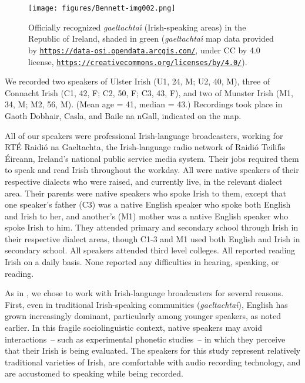 \documentclass[output=paper,colorlinks,citecolor=brown]{langscibook}
\begin{document}
\begin{figure}
    \texttt{[image: figures/Bennett-img002.png]}
    \caption{Officially recognized \emph{gaeltachta\'{\i}} (Irish-speaking areas) in the Republic of Ireland, shaded in green (\emph{gaeltachta\'{\i}} map data provided by \texttt{\url{https://data-osi.opendata.arcgis.com/}}, under CC by 4.0 license, \texttt{\url{https://creativecommons.org/licenses/by/4.0/}}).}
    \label{fig:map}
\end{figure}

We recorded two speakers of Ulster Irish (U1, 24, M; U2, 40, M), three of Connacht Irish (C1, 42, F; C2, 50, F; C3, 43, F), and two of Munster Irish (M1, 34, M; M2, 56, M). (Mean age = 41, median = 43.) Recordings took place in Gaoth Dobhair, Casla, and Baile na nGall, indicated on the map.

All of our speakers were professional Irish-language broadcasters, working for RT\'E Raidi\'o na Gaeltachta, the Irish-language radio network of Raidi\'o Teilif\'{\i}s \'Eireann, Ireland's national public service media system. Their jobs required them to speak and read Irish throughout the workday. All were native speakers of their respective dialects who were raised, and currently live, in the relevant dialect area. Their parents were native speakers who spoke Irish to them, except that one speaker's father (C3) was a native English speaker who spoke both English and Irish to her, and another's (M1) mother was a native English speaker who spoke Irish to him. They attended primary and secondary school through Irish in their respective dialect areas, though C1-3 and M1 used both English and Irish in secondary school. All speakers attended third level colleges. All reported reading Irish on a daily basis. None reported any difficulties in hearing, speaking, or reading.

As in \citet{Bennett_etal2018_Conamara_ultrasound}, we chose to work with Irish-language broadcasters for several reasons. First, even in traditional Irish-speaking communities (\emph{gael\-tachta\'{\i}}), English has grown increasingly dominant, particularly among younger speakers, as noted earlier. In this fragile sociolinguistic context, native speakers may avoid interactions~-- such as experimental phonetic studies~-- in which they perceive that their Irish is being evaluated. The speakers for this study represent relatively traditional varieties of Irish, are comfortable with audio recording technology, and are accustomed to speaking while being recorded.
\end{document}
